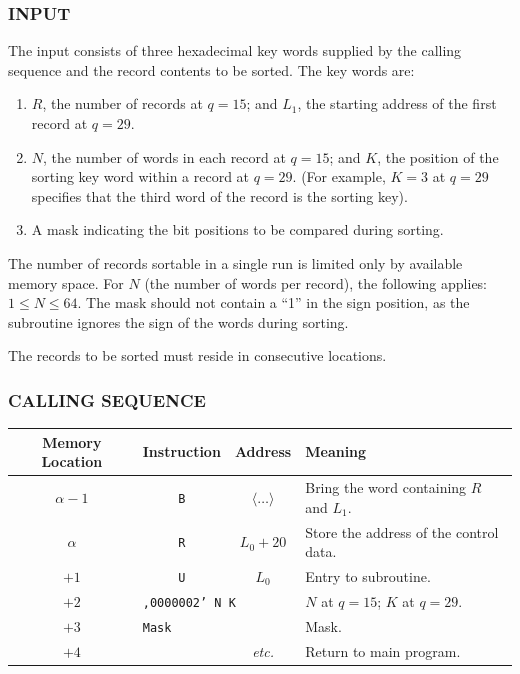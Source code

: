 \subsubsection*{INPUT}
The input consists of three hexadecimal key words supplied by the calling sequence and the record contents to be sorted. The key words are:
\begin{enumerate}
    \item $R$, the number of records at $q = 15$; and $L_1$, the starting address of the first record at $q = 29$.
    \item $N$, the number of words in each record at $q = 15$; and $K$, the position of the sorting key word within a record at $q = 29$. (For example, $K = 3$ at $q = 29$ specifies that the third word of the record is the sorting key).
    \item A mask indicating the bit positions to be compared during sorting.
\end{enumerate}

The number of records sortable in a single run is limited only by available memory space. For $N$ (the number of words per record), the following applies: $1 \le N \le 64$. The mask should not contain a ``1'' in the sign position, as the subroutine ignores the sign of the words during sorting.

The records to be sorted must reside in consecutive locations.

\subsubsection*{CALLING SEQUENCE}
\begin{table}[h!]
\centering
\begin{tabularx}{\textwidth}{cccX}
\toprule
\textbf{Memory Location} & \textbf{Instruction} & \textbf{Address} & \textbf{Meaning} \\
\midrule
$\alpha - 1$ & \texttt{B} & $\langle \dots \rangle$ & Bring the word containing $R$ and $L_1$. \\
$\alpha$     & \texttt{R} & $L_0 + 20$              & Store the address of the control data. \\
$+1$         & \texttt{U} & $L_0$                   & Entry to subroutine. \\
$+2$         & \multicolumn{2}{l}{\texttt{,0000002' N K}} & $N$ at $q=15$; $K$ at $q=29$. \\
$+3$         & \multicolumn{2}{l}{\texttt{Mask}}      & Mask. \\
$+4$         &            & \textit{etc.}           & Return to main program. \\
\bottomrule
\end{tabularx}
\end{table}

